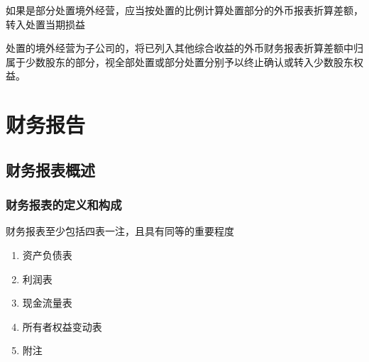 \documentclass[UTF8,12pt]{ctexart}
\numberwithin{equation}{section} %
\numberwithin{figure}{section}
\numberwithin{table}{section}
\begin{document}
	如果是部分处置境外经营，应当按处置的比例计算处置部分的外币报表折算差额，转入处置当期损益
	
	处置的境外经营为子公司的，将已列入其他综合收益的外币财务报表折算差额中归属于少数股东的部分，视全部处置或部分处置分别予以终止确认或转入少数股东权益。
	
	\newpage
	\section{财务报告}
	
	\subsection{财务报表概述}
	\subsubsection{财务报表的定义和构成}
	财务报表至少包括四表一注，且具有同等的重要程度
	\begin{enumerate}
		\item 资产负债表
		
		\item 利润表
		
		\item 现金流量表
		
		\item 所有者权益变动表
		
		\item 附注
	\end{enumerate}
\end{document}
